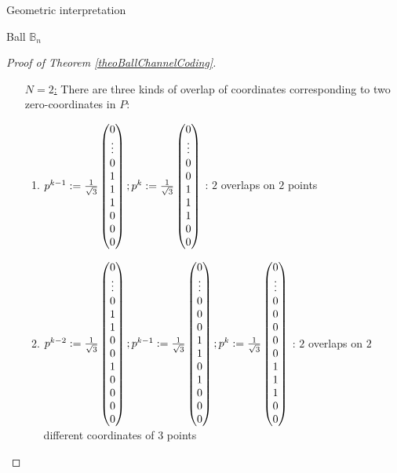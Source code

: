 \documentclass{article}
\theoremstyle{definition}
\theoremstyle{remark}
\begin{document}
\begin{subsection}{Geometric interpretation}
\begin{subsubsection}{Ball $\mathbb{B}_n$}
\begin{proof}[Proof of Theorem \ref{theoBallChannelCoding}]
\begin{itemize}
    \item[\underline{$N = 2$:}] There are three kinds of overlap of coordinates corresponding to two zero-coordinates in $P$:
      \begin{enumerate}
      \item $p^{k-1} := \frac{1}{\sqrt{3}}\pmqty{0\\\vdots\\0\\1\\1\\1\\0\\0\\0} ; p^k := \frac{1}{\sqrt{3}}\pmqty{0\\\vdots\\0\\0\\1\\1\\1\\0\\0}$ : $2$ overlaps on $2$ points
      \item $p^{k-2} := \frac{1}{\sqrt{3}}\pmqty{0\\\vdots\\0\\1\\1\\0\\0\\1\\0\\0\\0\\0} ; p^{k-1} := \frac{1}{\sqrt{3}}\pmqty{0\\\vdots\\0\\0\\0\\1\\1\\0\\1\\0\\0\\0} ; p^k := \frac{1}{\sqrt{3}}\pmqty{0\\\vdots\\0\\0\\0\\0\\0\\1\\1\\1\\0\\0}$ : $2$ overlaps on $2$ different coordinates of $3$ points

\end{enumerate}
\end{itemize}
\end{proof}
\end{subsubsection}
\end{subsection}
\end{document}
